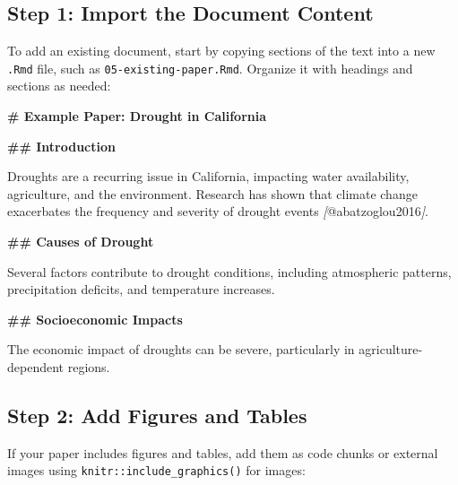 \documentclass[
]{book}
\newenvironment{Shaded}{\begin{snugshade}}{\end{snugshade}}
\newcommand{\CommentTok}[1]{\textcolor[rgb]{0.56,0.35,0.01}{\textit{#1}}}
\newcommand{\FunctionTok}[1]{\textcolor[rgb]{0.13,0.29,0.53}{\textbf{#1}}}
\newcommand{\NormalTok}[1]{#1}
\newcommand{\OtherTok}[1]{\textcolor[rgb]{0.56,0.35,0.01}{#1}}
\theoremstyle{definition}
\theoremstyle{definition}
\theoremstyle{definition}
\theoremstyle{definition}
\theoremstyle{remark}
\begin{document}
\subsection{Step 1: Import the Document Content}\label{step-1-import-the-document-content}

To add an existing document, start by copying sections of the text into a new \texttt{.Rmd} file, such as \texttt{05-existing-paper.Rmd}. Organize it with headings and sections as needed:

\begin{Shaded}
\begin{Highlighting}[]
\FunctionTok{\# Example Paper: Drought in California}

\FunctionTok{\#\# Introduction}

\NormalTok{Droughts are a recurring issue in California, impacting water availability, agriculture, and the environment. Research has shown that climate change exacerbates the frequency and severity of drought events }\CommentTok{[}\OtherTok{@abatzoglou2016}\CommentTok{]}\NormalTok{.}

\FunctionTok{\#\# Causes of Drought}

\NormalTok{Several factors contribute to drought conditions, including atmospheric patterns, precipitation deficits, and temperature increases.}

\FunctionTok{\#\# Socioeconomic Impacts}

\NormalTok{The economic impact of droughts can be severe, particularly in agriculture{-}dependent regions.}
\end{Highlighting}
\end{Shaded}

\subsection{Step 2: Add Figures and Tables}\label{step-2-add-figures-and-tables}

If your paper includes figures and tables, add them as code chunks or external images using \texttt{knitr::include\_graphics()} for images:
\end{document}
